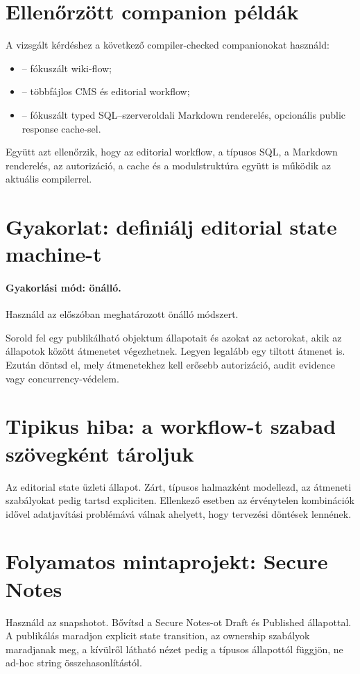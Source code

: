 \section{Ellenőrzött companion példák}
A vizsgált kérdéshez a következő compiler-checked companionokat használd:
\begin{itemize}
  \item {} -- fókuszált wiki-flow;
  \item {} -- többfájlos CMS és editorial workflow;
  \item {} -- fókuszált typed SQL--szerveroldali Markdown renderelés, opcionális public response cache-sel.
\end{itemize}
Együtt azt ellenőrzik, hogy az editorial workflow, a típusos SQL, a Markdown renderelés, az autorizáció, a cache és a modulstruktúra együtt is működik az aktuális compilerrel.

\section{Gyakorlat: definiálj editorial state machine-t}
\paragraph{Gyakorlási mód: önálló.} Használd az előszóban meghatározott önálló módszert.

Sorold fel egy publikálható objektum állapotait és azokat az actorokat, akik az állapotok között átmenetet végezhetnek. Legyen legalább egy tiltott átmenet is. Ezután döntsd el, mely átmenetekhez kell erősebb autorizáció, audit evidence vagy concurrency-védelem.

\section{Tipikus hiba: a workflow-t szabad szövegként tároljuk}
Az editorial state üzleti állapot. Zárt, típusos halmazként modellezd, az átmeneti szabályokat pedig tartsd expliciten. Ellenkező esetben az érvénytelen kombinációk idővel adatjavítási problémává válnak ahelyett, hogy tervezési döntések lennének.

\section{Folyamatos mintaprojekt: Secure Notes}
Használd az  snapshotot. Bővítsd a Secure Notes-ot Draft és Published állapottal. A publikálás maradjon explicit state transition, az ownership szabályok maradjanak meg, a kívülről látható nézet pedig a típusos állapottól függjön, ne ad-hoc string összehasonlítástól.

